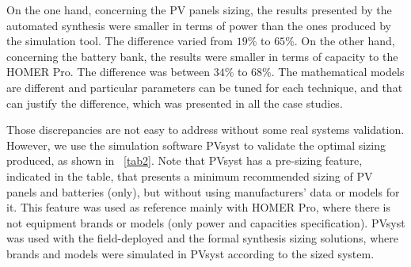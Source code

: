 \documentclass[runningheads]{llncs}
\begin{document}
On the one hand, concerning the PV panels sizing, the results presented by the automated synthesis were smaller in terms of power than the ones produced by the simulation tool. The difference varied from $19$\% to $65$\%. On the other hand, concerning the battery bank, the results were smaller in terms of capacity to the HOMER Pro. The difference was between $34$\% to $68$\%. The mathematical models are different and particular parameters can be tuned for each technique, and that can justify the difference, which was presented in all the case studies.

Those discrepancies are not easy to address without some real systems validation. However, we use the simulation software PVsyst to validate the optimal sizing produced, as shown in ~\ref{tab2}. Note that PVsyst has a pre-sizing feature, indicated in the table, that presents a minimum recommended sizing of PV panels and batteries (only), but without using manufacturers' data or models for it. This feature was used as reference mainly with HOMER Pro, where there is not equipment brands or models (only power and capacities specification). PVsyst was used with the field-deployed and the formal synthesis sizing solutions, where brands and models were simulated in PVsyst according to the sized system.
\end{document}

